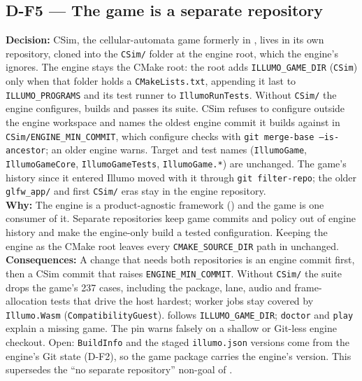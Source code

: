 \subsection*{D-F5 --- The game is a separate repository}
\begin{decisionbox}[title={D-F5 \quad 2026-10-11}]
\textbf{Decision:} CSim, the cellular-automata game formerly in
, lives in its own repository, cloned into the
\texttt{CSim/} folder at the engine root, which the engine's
 ignores. The engine stays the CMake root: the root
 adds \texttt{ILLUMO\_GAME\_DIR} (\texttt{CSim}) only
when that folder holds a \texttt{CMakeLists.txt}, appending it last to
\texttt{ILLUMO\_PROGRAMS} and its test runner to \texttt{IllumoRunTests}.
Without \texttt{CSim/} the engine configures, builds and passes its suite.
CSim refuses to configure outside the engine workspace and names the oldest
engine commit it builds against in \texttt{CSim/ENGINE\_MIN\_COMMIT}, which
configure checks with \texttt{git merge-base --is-ancestor}; an older engine
warns. Target and test names (\texttt{IllumoGame}, \texttt{IllumoGameCore},
\texttt{IllumoGameTests}, \texttt{IllumoGame.*}) are unchanged. The game's
history since it entered Illumo moved with it through \texttt{git
filter-repo}; the older \texttt{glfw\_app/} and first \texttt{CSim/} eras stay
in the engine repository.\\
\textbf{Why:} The engine is a product-agnostic framework
() and the game is one consumer of it.
Separate repositories keep game commits and policy out of engine history and
make the engine-only build a tested configuration. Keeping the engine as the
CMake root leaves every \texttt{CMAKE\_SOURCE\_DIR} path in
 unchanged.\\
\textbf{Consequences:} A change that needs both repositories is an engine
commit first, then a CSim commit that raises \texttt{ENGINE\_MIN\_COMMIT}.
Without \texttt{CSim/} the suite drops the game's 237 cases, including the
package, lane, audio and frame-allocation tests that drive the host hardest;
worker jobs stay covered by \texttt{Illumo.Wasm} (\texttt{CompatibilityGuest}).
 follows \texttt{ILLUMO\_GAME\_DIR}; \texttt{doctor} and
\texttt{play} explain a missing game. The pin warns falsely on a shallow or
Git-less engine checkout. Open: \texttt{BuildInfo} and the staged
\texttt{illumo.json} versions come from the engine's Git state (D-F2), so the
game package carries the engine's version. This supersedes the ``no separate
repository'' non-goal of .
\end{decisionbox}
